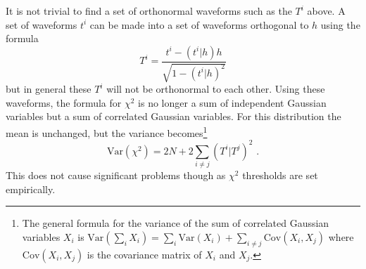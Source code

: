 \documentclass[11pt]{cuthesis}
\newcommand{\fs}{\text{ .}}
\begin{document}
It is not trivial to find a set of orthonormal waveforms such as the $T^i$ above. A set of waveforms $t^i$ can be made into a set of waveforms orthogonal to $h$ using the formula
\begin{equation}
T^i = \frac{t^i - (t^i|h)h}{\sqrt{1-(t^i|h)^2}}
\end{equation}
but in general these $T^i$ will not be orthonormal to each other. Using these waveforms, the formula for $\chi^2$ is no longer a sum of independent Gaussian variables but a sum of correlated Gaussian variables. For this distribution the mean is unchanged, but the variance becomes\footnote{The general formula for the variance of the sum of correlated Gaussian variables $X_i$ is $\text{Var}(\sum_i X_i) = \sum_i \text{Var}(X_i) + \sum_{i \neq j} \text{Cov}(X_i,X_j) $ where $\text{Cov}(X_i,X_j)$ is the covariance matrix of $X_i$ and $X_j$.}
\begin{equation}
\text{Var}(\chi^2) = 2N + 2\sum_{i \neq j} (T^i|T^j)^2 \fs
\end{equation}
This does not cause significant problems though as $\chi^2$ thresholds are set empirically. 
\end{document}
